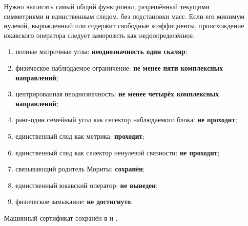 Нужно выписать самый общий функционал, разрешённый текущими симметриями и
единственным следом, без подстановки масс. Если его минимум нулевой,
вырожденный или содержит свободные коэффициенты, происхождение юкавского
оператора следует заморозить как недоопределённое.

\begin{protocol}
\begin{enumerate}
 \item полные матричные углы: \textbf{неоднозначность один скаляр};
 \item физическое наблюдаемое ограничение:
 \textbf{не менее пяти комплексных направлений};
 \item центрированная неоднозначность:
 \textbf{не менее четырёх комплексных направлений};
 \item ранг-один семейный угол как селектор наблюдаемого блока:
 \textbf{не проходит};
 \item единственный след как метрика: \textbf{проходит};
 \item единственный след как селектор ненулевой связности:
 \textbf{не проходит};
 \item связывающий родитель Мориты: \textbf{сохранён};
 \item единственный юкавский оператор: \textbf{не выведен};
 \item физическое замыкание: \textbf{не достигнуто}.
\end{enumerate}
\end{protocol}

Машинный сертификат сохранён в
 и
.